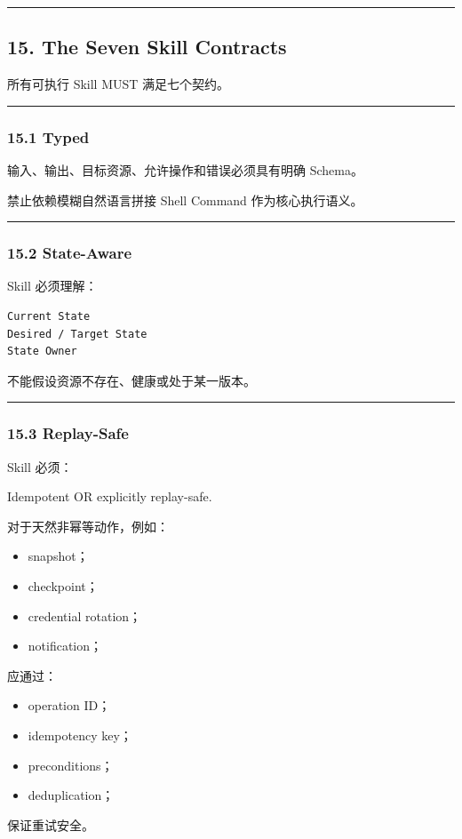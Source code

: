 \documentclass[11pt,a4paper]{article}
\begin{document}
\vspace{0.5em}\hrule\vspace{0.5em}
\subsection{15. The Seven Skill Contracts}
所有可执行 Skill MUST 满足七个契约。

\vspace{0.5em}\hrule\vspace{0.5em}
\subsubsection{15.1 Typed}
输入、输出、目标资源、允许操作和错误必须具有明确 Schema。

禁止依赖模糊自然语言拼接 Shell Command 作为核心执行语义。

\vspace{0.5em}\hrule\vspace{0.5em}
\subsubsection{15.2 State-Aware}
Skill 必须理解：

\begin{lstlisting}[language=text]
Current State
Desired / Target State
State Owner
\end{lstlisting}
不能假设资源不存在、健康或处于某一版本。

\vspace{0.5em}\hrule\vspace{0.5em}
\subsubsection{15.3 Replay-Safe}
Skill 必须：

\begin{gfmBlockquote}
Idempotent OR explicitly replay-safe.
\end{gfmBlockquote}
对于天然非幂等动作，例如：

\begin{itemize}
  \item snapshot；
  \item checkpoint；
  \item credential rotation；
  \item notification；
\end{itemize}
应通过：

\begin{itemize}
  \item operation ID；
  \item idempotency key；
  \item preconditions；
  \item deduplication；
\end{itemize}
保证重试安全。
\end{document}
